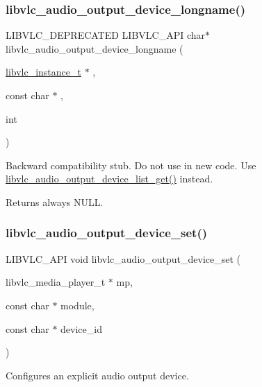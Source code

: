 \subsubsection{\texorpdfstring{libvlc\+\_\+audio\+\_\+output\+\_\+device\+\_\+longname()}{libvlc\_audio\_output\_device\_longname()}}
{\footnotesize\ttfamily L\+I\+B\+V\+L\+C\+\_\+\+D\+E\+P\+R\+E\+C\+A\+T\+ED L\+I\+B\+V\+L\+C\+\_\+\+A\+PI char$\ast$ libvlc\+\_\+audio\+\_\+output\+\_\+device\+\_\+longname (\begin{DoxyParamCaption}\item[{\hyperlink{group__libvlc__core_ga316d739a80da4678206c79f4d6c2e284}{libvlc\+\_\+instance\+\_\+t} $\ast$}]{,  }\item[{const char $\ast$}]{,  }\item[{int}]{ }\end{DoxyParamCaption})}

Backward compatibility stub. Do not use in new code. Use \hyperlink{group__libvlc__audio_ga4f94073a71cd9ee6641ce9bbbfdaf5f3}{libvlc\+\_\+audio\+\_\+output\+\_\+device\+\_\+list\+\_\+get()} instead. \begin{DoxyReturn}{Returns}
always N\+U\+LL. 
\end{DoxyReturn}
\mbox{\label{group__libvlc__audio_ga4553bc34b90313e6592ad1af0067f31d}} 
\subsubsection{\texorpdfstring{libvlc\+\_\+audio\+\_\+output\+\_\+device\+\_\+set()}{libvlc\_audio\_output\_device\_set()}}
{\footnotesize\ttfamily L\+I\+B\+V\+L\+C\+\_\+\+A\+PI void libvlc\+\_\+audio\+\_\+output\+\_\+device\+\_\+set (\begin{DoxyParamCaption}\item[{libvlc\+\_\+media\+\_\+player\+\_\+t $\ast$}]{mp,  }\item[{const char $\ast$}]{module,  }\item[{const char $\ast$}]{device\+\_\+id }\end{DoxyParamCaption})}

Configures an explicit audio output device.

